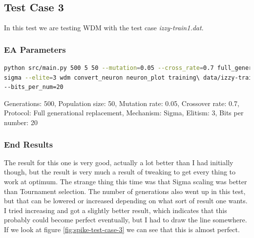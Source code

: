 \subsection{Test Case 3}\label{sec:test-case-3}
In this test we are testing WDM with the test case
\textit{izzy-train1.dat}.
\subsubsection{EA Parameters}\label{sec:test-case-3-parameters}
\begin{lstlisting}[frame=single, language=bash, caption=Command-line to
replicate the results]
python src/main.py 500 5 50 --mutation=0.05 --cross_rate=0.7 full_generational
sigma --elite=3 wdm convert_neuron neuron_plot training\ data/izzy-train1.dat
--bits_per_num=20
\end{lstlisting}
Generations: 500, Population size: 50, Mutation rate: 0.05, Crossover rate: 0.7, Protocol: Full generational replacement, Mechanism: Sigma, Elitism: 3, Bits per number: 20
\subsubsection{End Results}\label{sec:test-case-3-results}
The result for this one is very good, actually a lot better than I had initially
though, but the result is very much a result of tweaking to get every thing to
work at optimum. The strange thing this time was that Sigma scaling was better
than Tournament selection. The number of generations also went up in this test,
but that can be lowered or increased depending on what sort of result one wants.
I tried increasing and got a slightly better result, which indicates that this
probably could become perfect eventually, but I had to draw the line somewhere.
If we look at figure \ref{fig:spike-test-case-3} we can see that this is almost
perfect.

